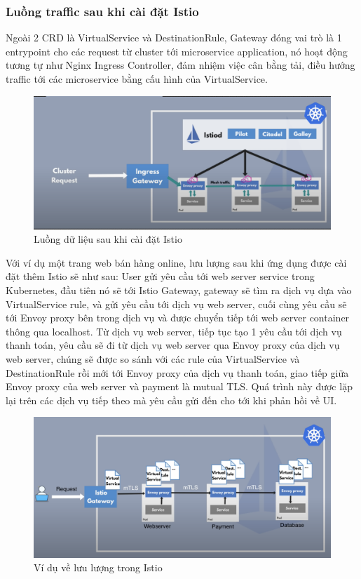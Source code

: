 \documentclass[14pt,a4paper]{book}
\begin{document}
			\subsubsection{Luồng traffic sau khi cài đặt Istio}
		\hspace{0.6cm}Ngoài 2 CRD là VirtualService và DestinationRule, Gateway đóng vai trò là 1 entrypoint cho các request từ cluster tới microservice application, nó hoạt động tương tự như Nginx Ingress Controller, đảm nhiệm việc cân bằng tải, điều hướng traffic tới các microservice bằng cấu hình của VirtualService.
		\begin{figure}[h]
			\centering
			\includegraphics[width=0.7\linewidth]{Pics/2.1.2-p2}
			\caption{Luồng dữ liệu sau khi cài đặt Istio}
			\label{fig:2.1.2-2}
		\end{figure}
		
		\newpage Với ví dụ một trang web bán hàng online, lưu lượng sau khi ứng dụng được cài đặt thêm Istio sẽ như sau: User gửi yêu cầu tới web server service trong Kubernetes, đầu tiên nó sẽ tới Istio Gateway, gateway sẽ tìm ra dịch vụ dựa vào VirtualService rule, và gửi yêu cầu tới dịch vụ web server, cuối cùng yêu cầu sẽ tới Envoy proxy bên trong dịch vụ và được chuyển tiếp tới web server container thông qua localhost. Từ dịch vụ web server, tiếp tục tạo 1 yêu cầu tới dịch vụ thanh toán, yêu cầu sẽ đi từ dịch vụ web server qua Envoy proxy của dịch vụ web server, chúng sẽ được so sánh với các rule của VirtualService và DestinationRule rồi mới tới Envoy proxy của dịch vụ thanh toán, giao tiếp giữa Envoy proxy của web server và payment là mutual TLS. Quá trình này được lặp lại trên các dịch vụ tiếp theo mà yêu cầu gửi đến cho tới khi phản hồi về UI.
		\begin{figure}[h]
			\centering
			\includegraphics[width=0.7\linewidth]{Pics/2.1.2-p3}
			\caption{Ví dụ về lưu lượng trong Istio}
			\label{fig:2.1.2-3}
		\end{figure}
		
\end{document}
